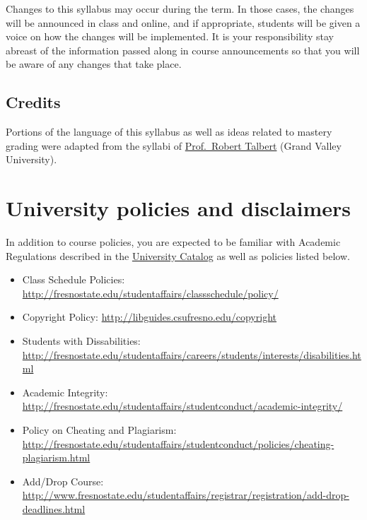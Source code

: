 Changes to this syllabus may occur during the term. In those cases, the
changes will be announced in class and online, and if appropriate,
students will be given a voice on how the changes will be implemented.
It is your responsibility stay abreast of the information passed along
in course announcements so that you will be aware of any changes that
take place.

\hypertarget{credits}{%
\subsection{Credits}\label{credits}}

Portions of the language of this syllabus as well as ideas related to
mastery grading were adapted from the syllabi of
\href{https://hackmd.io/@rtalbert235}{Prof.~Robert Talbert} (Grand
Valley University).

\hypertarget{university-policies-and-disclaimers}{%
\section{University policies and
disclaimers}\label{university-policies-and-disclaimers}}

In addition to course policies, you are expected to be familiar with
Academic Regulations described in the
\href{http://www.fresnostate.edu/catalog/academic-regulations/}{University
Catalog} as well as policies listed below.

\begin{itemize}
\tightlist
\item
  Class Schedule Policies:
  \url{http://fresnostate.edu/studentaffairs/classschedule/policy/}
\item
  Copyright Policy: \url{http://libguides.csufresno.edu/copyright}
\item
  Students with Dissabilities:
  \url{http://fresnostate.edu/studentaffairs/careers/students/interests/disabilities.html}
\item
  Academic Integrity:
  \url{http://fresnostate.edu/studentaffairs/studentconduct/academic-integrity/}
\item
  Policy on Cheating and Plagiarism:
  \url{http://fresnostate.edu/studentaffairs/studentconduct/policies/cheating-plagiarism.html}
\item
  Add/Drop Course:
  \href{http://fresnostate.edu/studentaffairs/classschedule/registration/add-drop.html}{http://www.fresnostate.edu/studentaffairs/registrar/registration/add-drop-deadlines.html}
\end{itemize}

